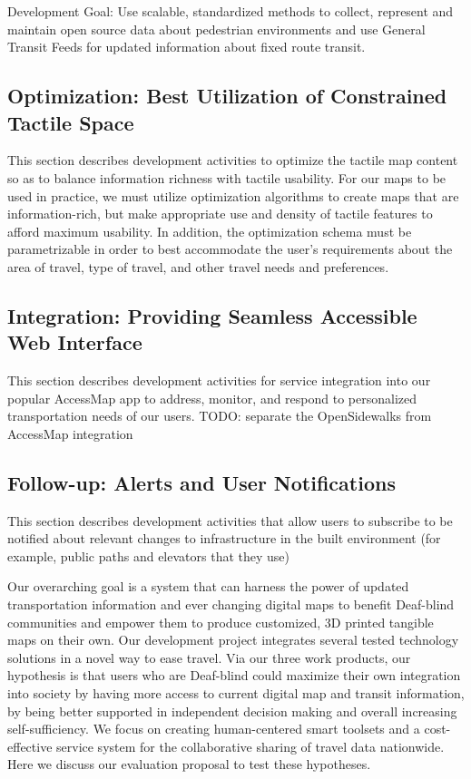 Development Goal: Use scalable, standardized methods to collect, represent and maintain open source data about pedestrian environments and use General Transit Feeds for updated information about fixed route transit.

\label{sec:mapping-data}


\subsection{Optimization: Best Utilization of Constrained Tactile Space} 

This section describes development activities to optimize the tactile map content so as to balance information richness with tactile usability. For our maps to be used in practice, we must utilize optimization algorithms to create maps that are information-rich, but make appropriate use and density of tactile features to afford maximum usability.
In addition, the optimization schema must be parametrizable in order to best accommodate the user’s requirements about the area of travel, type of travel, and other travel needs and preferences.
\label{sec:optimize}


\subsection{Integration: Providing Seamless Accessible Web Interface}
This section describes development activities for service integration into our popular AccessMap app to address, monitor, and respond to personalized transportation needs of our users.
\ac{TODO: separate the OpenSidewalks from AccessMap integration}
\label{sec:accessmap-integration}


\subsection{Follow-up: Alerts and User Notifications}
This section describes development activities that allow users to subscribe to be notified about relevant changes to infrastructure in the built environment (for example, public paths and elevators that they use)
\label{sec:alerts}


Our overarching goal is a system that can harness the power of updated transportation information and ever changing digital maps to benefit Deaf-blind communities and empower them to produce customized, 3D printed tangible maps on their own. Our development project integrates several tested technology solutions in a novel way to ease travel. Via our three work products, our hypothesis is that users who are Deaf-blind could maximize their own integration into society by having more access to current digital map and transit information, by being better supported in independent decision making and overall increasing self-sufficiency. We focus on creating human-centered smart toolsets  and a cost-effective service system for the collaborative sharing of travel data nationwide. Here we discuss our evaluation proposal to test these hypotheses.

